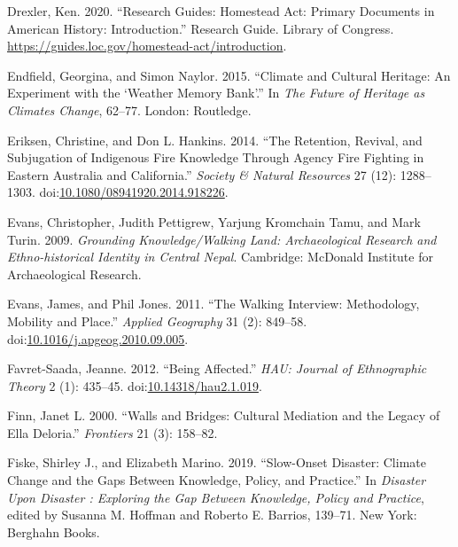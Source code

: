 \documentclass[
]{article}
\newlength{\cslhangindent}
\newenvironment{CSLReferences}[2] %
 {\begin{list}{}{%
  \setlength{\itemindent}{0pt}
  \setlength{\leftmargin}{0pt}
  \setlength{\parsep}{0pt}
  \ifodd #1
   \setlength{\leftmargin}{\cslhangindent}
   \setlength{\itemindent}{-1\cslhangindent}
  \fi
  \setlength{\itemsep}{#2\baselineskip}}}
 {\end{list}}
\begin{document}
\begin{CSLReferences}{1}{0}
Drexler, Ken. 2020. {``Research {Guides}: {Homestead Act}: {Primary Documents} in {American History}: {Introduction}.''} Research Guide. Library of Congress. \url{https://guides.loc.gov/homestead-act/introduction}.

Endfield, Georgina, and Simon Naylor. 2015. {``Climate and Cultural Heritage: An Experiment with the {`{Weather Memory Bank}'}.''} In \emph{The {Future} of {Heritage} as {Climates Change}}, 62--77. London: Routledge.

Eriksen, Christine, and Don L. Hankins. 2014. {``The {Retention}, {Revival}, and {Subjugation} of {Indigenous Fire Knowledge} Through {Agency Fire Fighting} in {Eastern Australia} and {California}.''} \emph{Society \& Natural Resources} 27 (12): 1288--1303. doi:\href{https://doi.org/10.1080/08941920.2014.918226}{10.1080/08941920.2014.918226}.

Evans, Christopher, Judith Pettigrew, Yarjung Kromchain Tamu, and Mark Turin. 2009. \emph{Grounding {Knowledge}/{Walking Land}: {Archaeological Research} and {Ethno-historical Identity} in {Central Nepal}}. Cambridge: McDonald Institute for Archaeological Research.

Evans, James, and Phil Jones. 2011. {``The Walking Interview: {Methodology}, Mobility and Place.''} \emph{Applied Geography} 31 (2): 849--58. doi:\href{https://doi.org/10.1016/j.apgeog.2010.09.005}{10.1016/j.apgeog.2010.09.005}.

Favret-Saada, Jeanne. 2012. {``Being Affected.''} \emph{HAU: Journal of Ethnographic Theory} 2 (1): 435--45. doi:\href{https://doi.org/10.14318/hau2.1.019}{10.14318/hau2.1.019}.

Finn, Janet L. 2000. {``Walls and {Bridges}: {Cultural Mediation} and the {Legacy} of {Ella Deloria}.''} \emph{Frontiers} 21 (3): 158--82.

Fiske, Shirley J., and Elizabeth Marino. 2019. {``Slow-{Onset Disaster}: {Climate Change} and the {Gaps} Between {Knowledge}, {Policy}, and {Practice}.''} In \emph{Disaster Upon {Disaster} : {Exploring} the {Gap Between Knowledge}, {Policy} and {Practice}}, edited by Susanna M. Hoffman and Roberto E. Barrios, 139--71. New York: Berghahn Books.


\end{CSLReferences}
\end{document}
